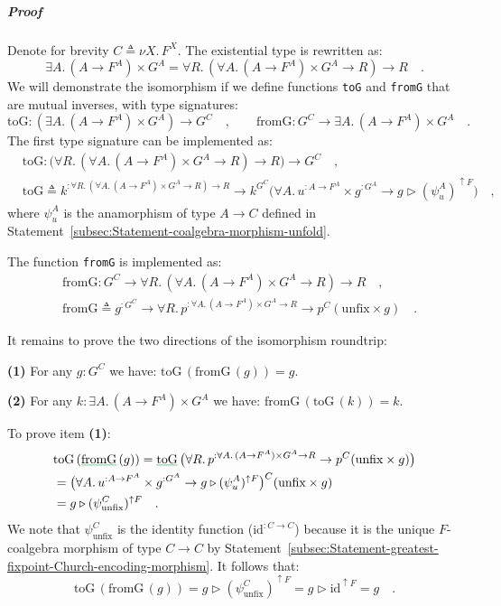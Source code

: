 \subparagraph{Proof}

Denote for brevity $C\triangleq\nu X.\,F^{X}$. The existential type
is rewritten as:
\[
\exists A.\,(A\rightarrow F^{A})\times G^{A}=\forall R.\,(\forall A.\,(A\rightarrow F^{A})\times G^{A}\rightarrow R)\rightarrow R\quad.
\]
We will demonstrate the isomorphism if we define functions \lstinline!toG!
and \lstinline!fromG! that are mutual inverses, with type signatures:
\[
\text{toG}:(\exists A.\,(A\rightarrow F^{A})\times G^{A})\rightarrow G^{C}\quad,\quad\quad\text{fromG}:G^{C}\rightarrow\exists A.\,(A\rightarrow F^{A})\times G^{A}\quad.
\]
The first type signature can be implemented as:
\begin{align*}
 & \text{toG}:\big(\forall R.\,(\forall A.\,(A\rightarrow F^{A})\times G^{A}\rightarrow R)\rightarrow R\big)\rightarrow G^{C}\quad,\\
 & \text{toG}\triangleq k^{:\forall R.\,(\forall A.\,(A\rightarrow F^{A})\times G^{A}\rightarrow R)\rightarrow R}\rightarrow k^{G^{C}}\big(\forall A.\,u^{:A\rightarrow F^{A}}\times g^{:G^{A}}\rightarrow g\triangleright(\psi_{u}^{A})^{\uparrow F}\big)\quad,
\end{align*}
where $\psi_{u}^{A}$ is the anamorphism of type $A\rightarrow C$
defined in Statement~\ref{subsec:Statement-coalgebra-morphism-unfold}.

The function \lstinline!fromG! is implemented as:
\begin{align*}
 & \text{fromG}:G^{C}\rightarrow\forall R.\,(\forall A.\,(A\rightarrow F^{A})\times G^{A}\rightarrow R)\rightarrow R\quad,\\
 & \text{fromG}\triangleq g^{:G^{C}}\rightarrow\forall R.\,p^{:\forall A.\,(A\rightarrow F^{A})\times G^{A}\rightarrow R}\rightarrow p^{C}(\text{unfix}\times g)\quad.
\end{align*}

It remains to prove the two directions of the isomorphism roundtrip:

\textbf{(1)} For any $g:G^{C}$ we have: $\text{toG}\,(\text{fromG}\,(g))=g$.

\textbf{(2)} For any $k:\exists A.\,(A\rightarrow F^{A})\times G^{A}$
we have: $\text{fromG}\,(\text{toG}\,(k))=k$.

To prove item \textbf{(1)}:
\begin{align*}
 & \text{toG}\,(\gunderline{\text{fromG}}\,(g))=\gunderline{\text{toG}}\,\big(\forall R.\,p^{:\forall A.\,(A\rightarrow F^{A})\times G^{A}\rightarrow R}\rightarrow p^{C}(\text{unfix}\times g)\big)\\
 & =\big(\forall A.\,u^{:A\rightarrow F^{A}}\times g^{:G^{A}}\rightarrow g\triangleright(\psi_{u}^{A})^{\uparrow F}\big)^{C}(\text{unfix}\times g)\\
 & =g\triangleright(\psi_{\text{unfix}}^{C})^{\uparrow F}\quad.
\end{align*}
We note that $\psi_{\text{unfix}}^{C}$ is the identity function ($\text{id}^{:C\rightarrow C}$)
because it is the unique $F$-coalgebra morphism of type $C\rightarrow C$
by Statement~\ref{subsec:Statement-greatest-fixpoint-Church-encoding-morphism}.
It follows that:
\[
\text{toG}\,(\text{fromG}\,(g))=g\triangleright(\psi_{\text{unfix}}^{C})^{\uparrow F}=g\triangleright\text{id}^{\uparrow F}=g\quad.
\]

